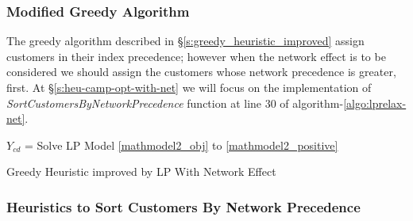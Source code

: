 \documentclass[11pt]{article}
\begin{document}
\subsubsection{Modified Greedy Algorithm}
The greedy algorithm described in \S \ref{s:greedy_heuristic_improved} assign customers in their index precedence; however when the network effect is to be considered we should assign the customers whose network precedence is greater, first. At \S \ref{s:heu-camp-opt-with-net} we will focus on the implementation of \textit{SortCustomersByNetworkPrecedence} function at line 30 of algorithm-\ref{algo:lprelax-net}.
\\
\begin{algorithm}[H]
\DontPrintSemicolon
{}

  \;
$Y_{{c}{d}}$ = Solve LP Model \eqref{mathmodel2_obj} to \eqref{mathmodel2_positive}

\;
\caption{Greedy Heuristic improved by LP With Network Effect}
\label{algo:lprelax-net}
\end{algorithm}

\subsubsection{Heuristics to Sort Customers By Network Precedence \label{s:heu-camp-opt-with-net}}
\end{document}
